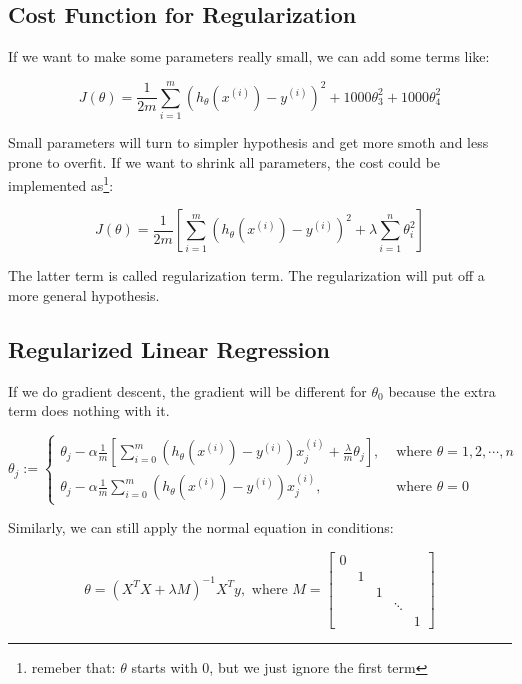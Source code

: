 \documentclass[black,simple]{../elegantbook}
\begin{document}
\subsection{Cost Function for Regularization}

If we want to make some parameters really small, we can add some terms like:

\[J(\theta) = \frac{1}{2m}\sum_{i=1}^m(h_\theta(x^{(i)}) - y^{(i)})^2
+ 1000 \theta_3^2 + 1000 \theta_4^2
\]

Small parameters will turn to simpler hypothesis and get more smoth and less prone to overfit. If we want to shrink all parameters, the cost could be implemented as\footnote{remeber that: \(\theta\) starts with 0, but we just ignore the first term }:

\[J(\theta) = \frac{1}{2m}\left[\sum_{i=1}^m(h_\theta(x^{(i)}) - y^{(i)})^2 + \lambda \sum_{i=1}^n\theta_i^2 \right]\]

The latter term is called regularization term. The regularization will put off a more general hypothesis.

\subsection{Regularized Linear Regression}

If we do gradient descent, the gradient will be different for \(\theta_0\) because the extra term does nothing with it.


\[\theta_j := \left\{
    \begin{aligned}
     \theta_j - \alpha \frac{1}{m} \left[ \sum_{i = 0}^m (h_\theta(x^{(i)}) - y^{(i)})x_j^{(i)}+ \frac{\lambda}{m}\theta_j\right], &\text{ where } \theta = 1, 2, \cdots , n\\
     \theta_j - \alpha \frac{1}{m} \sum_{i = 0}^m (h_\theta(x^{(i)}) - y^{(i)})x_j^{(i)}, &\text{ where } \theta = 0
\end{aligned}\right.\]

Similarly, we can still apply the normal equation in conditions: 

\[
    \theta = \left(X^T X + \lambda M \right)^{-1} X^T y, \text{ where } M = \left[\begin{matrix}
        0 & & & & \\
        & 1 & & & \\
        & & 1 & & \\
        & & & \ddots & \\
        & & & & 1
    \end{matrix}\right]
\]
\end{document}
